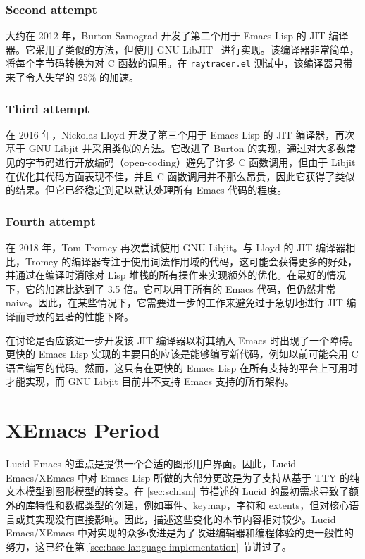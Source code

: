 \documentclass[format=acmsmall,screen]{acmart}
\begin{document}
\subsubsection*{Second attempt}

大约在 2012 年，Burton Samograd 开发了第二个用于 Emacs Lisp 的 JIT 编译器。它采用了类似的方法，但使用 GNU LibJIT~\cite{GNULibjit} 进行实现。该编译器非常简单，将每个字节码转换为对 C 函数的调用。在 \texttt{raytracer.el} 测试中，该编译器只带来了令人失望的 25\% 的加速。

\subsubsection*{Third attempt}

在 2016 年，Nickolas Lloyd 开发了第三个用于 Emacs Lisp 的 JIT 编译器，再次基于 GNU Libjit 并采用类似的方法。它改进了 Burton 的实现，通过对大多数常见的字节码进行开放编码（open-coding）避免了许多 C 函数调用，但由于 Libjit 在优化其代码方面表现不佳，并且 C 函数调用并不那么昂贵，因此它获得了类似的结果。但它已经稳定到足以默认处理所有 Emacs 代码的程度。

\subsubsection*{Fourth attempt}

在 2018 年，Tom Tromey 再次尝试使用 GNU Libjit。与 Lloyd 的 JIT 编译器相比，Tromey 的编译器专注于使用词法作用域的代码，这可能会获得更多的好处，并通过在编译时消除对 Lisp 堆栈的所有操作来实现额外的优化。在最好的情况下，它的加速比达到了 3.5 倍。它可以用于所有的 Emacs 代码，但仍然非常 naive。因此，在某些情况下，它需要进一步的工作来避免过于急切地进行 JIT 编译而导致的显著的性能下降。

在讨论是否应该进一步开发该 JIT 编译器以将其纳入 Emacs 时出现了一个障碍。更快的 Emacs Lisp 实现的主要目的应该是能够编写新代码，例如以前可能会用 C 语言编写的代码。然而，这只有在更快的 Emacs Lisp 在所有支持的平台上可用时才能实现，而 GNU Libjit 目前并不支持 Emacs 支持的所有架构。


\section{XEmacs Period}         %
\label{sec:xemacs}

Lucid Emacs 的重点是提供一个合适的图形用户界面。因此，Lucid Emacs/XEmacs 中对 Emacs Lisp 所做的大部分更改是为了支持从基于 TTY 的纯文本模型到图形模型的转变。在 \ref{sec:schism} 节描述的 Lucid 的最初需求导致了额外的库特性和数据类型的创建，例如事件、keymap，字符和 extents，但对核心语言或其实现没有直接影响。因此，描述这些变化的本节内容相对较少。Lucid Emacs/XEmacs 中对实现的众多改进是为了改进编辑器和编程体验的更一般性的努力，这已经在第 \ref{sec:base-language-implementation} 节讲过了。
\end{document}
